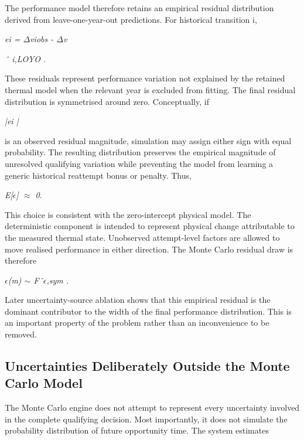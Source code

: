 The performance model therefore retains an empirical residual distribution derived from leave-one-year-out predictions. For historical transition i,

\begin{center}\textit{ei = \ensuremath{\Delta}viobs - \ensuremath{\Delta}v}\end{center}

\begin{center}\textit{ˆ i,LOYO .}\end{center}

These residuals represent performance variation not explained by the retained thermal model when the relevant year is excluded from fitting. The final residual distribution is symmetrised around zero. Conceptually, if

\begin{center}\textit{|ei |}\end{center}

is an observed residual magnitude, simulation may assign either sign with equal probability. The resulting distribution preserves the empirical magnitude of unresolved qualifying variation while preventing the model from learning a generic historical reattempt bonus or penalty. Thus,

\begin{center}\textit{E[\ensuremath{\epsilon}] \ensuremath{\approx} 0.}\end{center}

This choice is consistent with the zero-intercept physical model. The deterministic component is intended to represent physical change attributable to the measured thermal state. Unobserved attempt-level factors are allowed to move realised performance in either direction. The Monte Carlo residual draw is therefore

\begin{center}\textit{\ensuremath{\epsilon}(m) \ensuremath{\sim} Fˆ\ensuremath{\epsilon},sym .}\end{center}

Later uncertainty-source ablation shows that this empirical residual is the dominant contributor to the width of the final performance distribution. This is an important property of the problem rather than an inconvenience to be removed.

\subsection{Uncertainties Deliberately Outside the Monte Carlo Model}
The Monte Carlo engine does not attempt to represent every uncertainty involved in the complete qualifying decision. Most importantly, it does not simulate the probability distribution of future opportunity time. The system estimates

